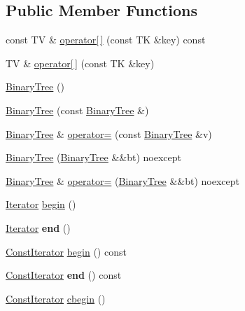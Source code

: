 \subsection*{Public Member Functions}
\begin{DoxyCompactItemize}
\item 
const TV \& \mbox{\hyperlink{classBinaryTree_ab5087864bf9bd49c1e5a79640066e34e}{operator\mbox{[}$\,$\mbox{]}}} (const TK \&key) const
\item 
TV \& \mbox{\hyperlink{classBinaryTree_a21bebae9adf0939f622b2bb47540694a}{operator\mbox{[}$\,$\mbox{]}}} (const TK \&key)
\item 
\mbox{\hyperlink{classBinaryTree_a18b4981a8d885a296b144462729c0679}{Binary\+Tree}} ()
\item 
\mbox{\hyperlink{classBinaryTree_a8cfb4f89d47accb81042824dca065946}{Binary\+Tree}} (const \mbox{\hyperlink{classBinaryTree}{Binary\+Tree}} \&)
\item 
\mbox{\hyperlink{classBinaryTree}{Binary\+Tree}} \& \mbox{\hyperlink{classBinaryTree_ad954acd76e1ad805b1bc8b7964dd9a58}{operator=}} (const \mbox{\hyperlink{classBinaryTree}{Binary\+Tree}} \&v)
\item 
\mbox{\hyperlink{classBinaryTree_a22a4831494c378f556151e321cdf917b}{Binary\+Tree}} (\mbox{\hyperlink{classBinaryTree}{Binary\+Tree}} \&\&bt) noexcept
\item 
\mbox{\hyperlink{classBinaryTree}{Binary\+Tree}} \& \mbox{\hyperlink{classBinaryTree_a6a3f46892900021d0e7304d762c47af8}{operator=}} (\mbox{\hyperlink{classBinaryTree}{Binary\+Tree}} \&\&bt) noexcept
\item 
\mbox{\hyperlink{classBinaryTree_1_1Iterator}{Iterator}} \mbox{\hyperlink{classBinaryTree_a828acf65e70cf4b6e106807a052ca508}{begin}} ()
\item 
\mbox{\label{classBinaryTree_af27fde669bad584ff4bc399be81d93b7}} 
\mbox{\hyperlink{classBinaryTree_1_1Iterator}{Iterator}} {\bfseries end} ()
\item 
\mbox{\hyperlink{classBinaryTree_1_1ConstIterator}{Const\+Iterator}} \mbox{\hyperlink{classBinaryTree_aaf9049aa9e91bed50e9543b6db442d80}{begin}} () const
\item 
\mbox{\label{classBinaryTree_ace2351a2760c864d97fd61878cc348a6}} 
\mbox{\hyperlink{classBinaryTree_1_1ConstIterator}{Const\+Iterator}} {\bfseries end} () const
\item 
\mbox{\hyperlink{classBinaryTree_1_1ConstIterator}{Const\+Iterator}} \mbox{\hyperlink{classBinaryTree_afc1bfd2d748acb391605ffcf8c86439d}{cbegin}} ()

\end{DoxyCompactItemize}
